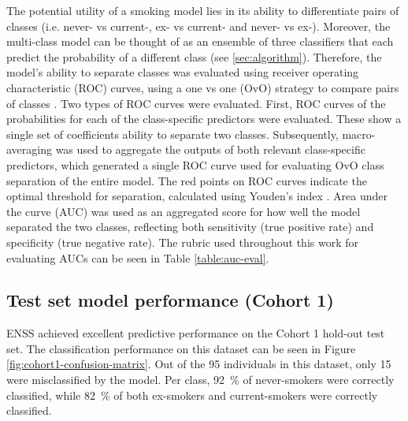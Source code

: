 \documentclass{article} %
\begin{document}
The potential utility of a smoking model lies in its ability to differentiate pairs of classes (i.e. never- vs current-, ex- vs current- and never- vs ex-). Moreover, the multi-class model can be thought of as an ensemble of three classifiers that each predict the probability of a different class (see \ref{sec:algorithm}). Therefore, the model's ability to separate classes was evaluated using receiver operating characteristic (ROC) curves, using a one vs one (OvO) strategy to compare pairs of classes \cite{scikit-learn-roc-example}. Two types of ROC curves were evaluated. First, ROC curves of the probabilities for each of the class-specific predictors were evaluated. These show a single set of coefficients ability to separate two classes. Subsequently, macro-averaging \cite{scikit-learn-roc-example} was used to aggregate the outputs of both relevant class-specific predictors, which generated a single ROC curve used for evaluating OvO class separation of the entire model.
The red points on ROC curves indicate the optimal threshold for separation, calculated using Youden's index \cite{youden1950index}. Area under the curve (AUC) was used as an aggregated score for how well the model separated the two classes, reflecting both sensitivity (true positive rate) and specificity (true negative rate). The rubric used throughout this work for evaluating AUCs can be seen in Table \ref{table:auc-eval}.



\newpage
\subsection{Test set model performance (Cohort 1)} \label{sec:cohort1-performance}
ENSS achieved excellent predictive performance on the Cohort 1 hold-out test set. The classification performance on this dataset can be seen in Figure \ref{fig:cohort1-confusion-matrix}. Out of the 95 individuals in this dataset, only 15 were misclassified by the model. Per class, \SI{92}{\percent} of never-smokers were correctly classified, while \SI{82}{\percent} of both ex-smokers and current-smokers were correctly classified.
\end{document}
